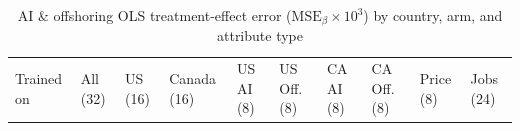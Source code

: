 \documentclass[
  11pt,
  letterpaper,
]{article}
\makeatletter
\newcommand\table@defaultsize{\footnotesize}
\let\table@size\table@defaultsize
\newcommand\nexttablesize[1]{\gdef\table@size{#1}}
\makeatother
\begin{document}
\nexttablesize{\scriptsize}
{\def\LTcaptype{apptbl}
\begin{longtable}[]{@{}
  >{\raggedright\arraybackslash}p{}
  >{\raggedleft\arraybackslash}p{}
  >{\raggedleft\arraybackslash}p{}
  >{\raggedleft\arraybackslash}p{}
  >{\raggedleft\arraybackslash}p{}
  >{\raggedleft\arraybackslash}p{}
  >{\raggedleft\arraybackslash}p{}
  >{\raggedleft\arraybackslash}p{}
  >{\raggedleft\arraybackslash}p{}
  >{\raggedleft\arraybackslash}p{}@{}}
\caption{{\label{apptbl-magistro-subsets}}AI \& offshoring OLS
treatment-effect error (\(\mathrm{MSE}_\beta \times 10^3\)) by country,
arm, and attribute type}\tabularnewline
\toprule\noalign{}
\begin{minipage}[b]{\linewidth}\raggedright
Trained on
\end{minipage} & \begin{minipage}[b]{\linewidth}\raggedleft
All (32)
\end{minipage} & \begin{minipage}[b]{\linewidth}\raggedleft
US (16)
\end{minipage} & \begin{minipage}[b]{\linewidth}\raggedleft
Canada (16)
\end{minipage} & \begin{minipage}[b]{\linewidth}\raggedleft
US AI (8)
\end{minipage} & \begin{minipage}[b]{\linewidth}\raggedleft
US Off. (8)
\end{minipage} & \begin{minipage}[b]{\linewidth}\raggedleft
CA AI (8)
\end{minipage} & \begin{minipage}[b]{\linewidth}\raggedleft
CA Off. (8)
\end{minipage} & \begin{minipage}[b]{\linewidth}\raggedleft
Price (8)
\end{minipage} & \begin{minipage}[b]{\linewidth}\raggedleft
Jobs (24)
\end{minipage} \\

\end{longtable}}
\end{document}

